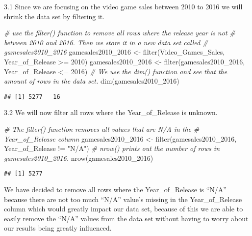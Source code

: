 \documentclass[
]{article}
\newenvironment{Shaded}{\begin{snugshade}}{\end{snugshade}}
\newcommand{\CommentTok}[1]{\textcolor[rgb]{0.56,0.35,0.01}{\textit{#1}}}
\newcommand{\DecValTok}[1]{\textcolor[rgb]{0.00,0.00,0.81}{#1}}
\newcommand{\FunctionTok}[1]{\textcolor[rgb]{0.00,0.00,0.00}{#1}}
\newcommand{\NormalTok}[1]{#1}
\newcommand{\OtherTok}[1]{\textcolor[rgb]{0.56,0.35,0.01}{#1}}
\newcommand{\SpecialCharTok}[1]{\textcolor[rgb]{0.00,0.00,0.00}{#1}}
\newcommand{\StringTok}[1]{\textcolor[rgb]{0.31,0.60,0.02}{#1}}
\begin{document}
3.1 Since we are focusing on the video game sales between 2010 to 2016
we will shrink the data set by filtering it.

\begin{Shaded}
\begin{Highlighting}[]
\CommentTok{\# use the filter() function to remove all rows where the release year is not}
\CommentTok{\# between 2010 and 2016. Then we store it in a new data set called}
\CommentTok{\# gamesales2010\_2016}
\NormalTok{gamesales2010\_2016 }\OtherTok{\textless{}{-}} \FunctionTok{filter}\NormalTok{(Video\_Games\_Sales, Year\_of\_Release }\SpecialCharTok{\textgreater{}=} \DecValTok{2010}\NormalTok{)}
\NormalTok{gamesales2010\_2016 }\OtherTok{\textless{}{-}} \FunctionTok{filter}\NormalTok{(gamesales2010\_2016, Year\_of\_Release }\SpecialCharTok{\textless{}=} \DecValTok{2016}\NormalTok{)}
\CommentTok{\# We use the dim() function and see that the amount of rows in the data set.}
\FunctionTok{dim}\NormalTok{(gamesales2010\_2016)}
\end{Highlighting}
\end{Shaded}

\begin{verbatim}
## [1] 5277   16
\end{verbatim}

3.2 We will now filter all rows where the Year\_of\_Release is unknown.

\begin{Shaded}
\begin{Highlighting}[]
\CommentTok{\# The filter() function removes all values that are \textquotesingle{}N/A\textquotesingle{} in the}
\CommentTok{\# Year\_of\_Release column}
\NormalTok{gamesales2010\_2016 }\OtherTok{\textless{}{-}} \FunctionTok{filter}\NormalTok{(gamesales2010\_2016, Year\_of\_Release }\SpecialCharTok{!=} \StringTok{"N/A"}\NormalTok{)}
\CommentTok{\# nrow() prints out the number of rows in gamesales2010\_2016.}
\FunctionTok{nrow}\NormalTok{(gamesales2010\_2016)}
\end{Highlighting}
\end{Shaded}

\begin{verbatim}
## [1] 5277
\end{verbatim}

We have decided to remove all rows where the Year\_of\_Release is
``N/A'' because there are not too much ``N/A'' value's missing in the
Year\_of\_Release column which would greatly impact our data set,
because of this we are able to easily remove the ``N/A'' values from the
data set without having to worry about our results being greatly
influenced.
\end{document}
